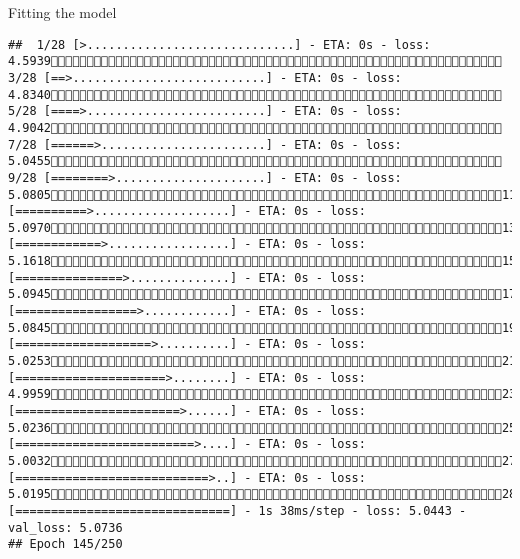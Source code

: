 \documentclass[
  ignorenonframetext,
]{beamer}
\begin{document}
\begin{frame}[fragile]{Fitting the model}
\begin{verbatim}
##  1/28 [>.............................] - ETA: 0s - loss: 4.5939 3/28 [==>...........................] - ETA: 0s - loss: 4.8340 5/28 [====>.........................] - ETA: 0s - loss: 4.9042 7/28 [======>.......................] - ETA: 0s - loss: 5.0455 9/28 [========>.....................] - ETA: 0s - loss: 5.080511/28 [==========>...................] - ETA: 0s - loss: 5.097013/28 [============>.................] - ETA: 0s - loss: 5.161815/28 [===============>..............] - ETA: 0s - loss: 5.094517/28 [=================>............] - ETA: 0s - loss: 5.084519/28 [===================>..........] - ETA: 0s - loss: 5.025321/28 [=====================>........] - ETA: 0s - loss: 4.995923/28 [=======================>......] - ETA: 0s - loss: 5.023625/28 [=========================>....] - ETA: 0s - loss: 5.003227/28 [===========================>..] - ETA: 0s - loss: 5.019528/28 [==============================] - 1s 38ms/step - loss: 5.0443 - val_loss: 5.0736
## Epoch 145/250

\end{verbatim}
\end{frame}
\end{document}
